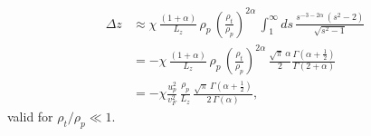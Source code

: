 \documentclass[submission, Phys]{SciPost}
\begin{document}
\begin{appendix}
\begin{align}
    \Delta z&\approx\chi\,\frac{(1+\alpha)}{L_z}\,\rho_p\,\left(\frac{\rho_t}{\rho_p}\right)^{2\alpha}\,\int_{1}^\infty ds\,\frac{s^{-3-2\alpha}\,\left(s^2-2\right)}{\sqrt{s^2-1}}\nonumber\\
    &=-\chi\,\frac{(1+\alpha)}{L_z}\,\rho_p\,\left(\frac{\rho_t}{\rho_p}\right)^{2\alpha}\,\frac{\sqrt{\pi}\,\alpha}{2}\frac{\Gamma\left(\alpha+\frac{1}{2}\right)}{\Gamma(2+\alpha)}\nonumber\\
    &=-\chi\frac{u_p^{2}}{v_F^2}\,\frac{\rho_p}{L_z}\,\frac{\sqrt{\pi}\,\Gamma\left(\alpha+\frac{1}{2}\right)}{2\,\Gamma(\alpha)},
\end{align}
valid for $\rho_t/\rho_p\ll1$.

\end{appendix}

\nolinenumbers
\end{document}
